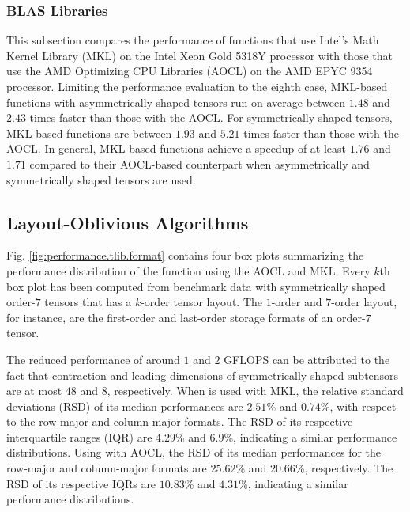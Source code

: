 \subsubsection{BLAS Libraries}
This subsection compares the performance of functions that use Intel's Math Kernel Library (MKL) on the Intel Xeon Gold 5318Y processor with those that use the AMD Optimizing CPU Libraries (AOCL) on the AMD EPYC 9354 processor. 
Limiting the performance evaluation to the eighth case, MKL-based functions with asymmetrically shaped tensors run on average between $1.48$ and $2.43$ times faster than those with the AOCL.
For symmetrically shaped tensors, MKL-based functions are between $1.93$ and $5.21$ times faster than those with the AOCL.
In general, MKL-based functions achieve a speedup of at least $1.76$ and $1.71$ compared to their AOCL-based counterpart when asymmetrically and symmetrically shaped tensors are used.


\subsection{Layout-Oblivious Algorithms}
Fig. \ref{fig:performance.tlib.format} contains four box plots summarizing the performance distribution of the  function using the AOCL and MKL.
Every $k$th box plot has been computed from benchmark data with symmetrically shaped order-$7$ tensors that has a $k$-order tensor layout.
The $1$-order and $7$-order layout, for instance, are the first-order and last-order storage formats of an order-$7$ tensor.

The reduced performance of around $1$ and $2$ GFLOPS can be attributed to the fact that contraction and leading dimensions of symmetrically shaped subtensors are at most $48$ and $8$, respectively.
When  is used with MKL, the relative standard deviations (RSD) of its median performances are $2.51$\% and $0.74$\%, with respect to the row-major and column-major formats.
The RSD of its respective interquartile ranges (IQR) are $4.29$\% and $6.9$\%, indicating a similar performance distributions.
Using  with AOCL, the RSD of its median performances for the row-major and column-major formats are $25.62$\% and $20.66$\%, respectively.
The RSD of its respective IQRs are $10.83$\% and $4.31$\%, indicating a similar performance distributions.

